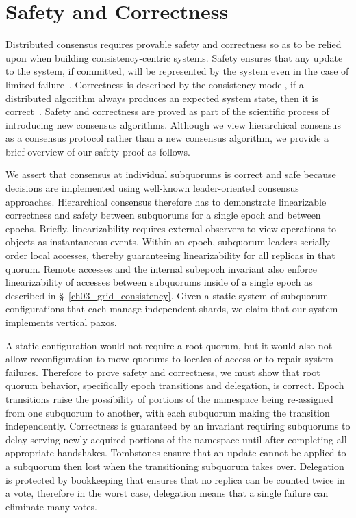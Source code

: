 \section{Safety and Correctness}
\label{ch03_safety}

Distributed consensus requires provable safety and correctness so as to be relied upon when building consistency-centric systems.
Safety ensures that any update to the system, if committed, will be represented by the system even in the case of limited failure~\cite{safety}.
Correctness is described by the consistency model, if a distributed algorithm always produces an expected system state, then it is correct~\cite{correctness}.
Safety and correctness are proved as part of the scientific process of introducing new consensus algorithms.
Although we view hierarchical consensus as a consensus protocol rather than a new consensus algorithm, we provide a brief overview of our safety proof as follows.

We assert that consensus at individual subquorums is correct and safe because decisions are implemented using well-known leader-oriented consensus approaches.
Hierarchical consensus therefore has to demonstrate linearizable correctness and safety between subquorums for a single epoch and between epochs.
Briefly, linearizability requires external observers to view operations to objects as instantaneous events.
Within an epoch, subquorum leaders serially order local accesses, thereby guaranteeing linearizability for all replicas in that quorum.
Remote accesses and the internal subepoch invariant also enforce linearizability of accesses between subquorums inside of a single epoch as described in \S~\ref{ch03_grid_consistency}.
Given a static system of subquorum configurations that each manage independent shards, we claim that our system implements vertical paxos.

A static configuration would not require a root quorum, but it would also not allow reconfiguration to move quorums to locales of access or to repair system failures.
Therefore to prove safety and correctness, we must show that root quorum behavior, specifically epoch transitions and delegation, is correct.
Epoch transitions raise the possibility of portions of the namespace being re-assigned from one subquorum to another, with each subquorum making the transition independently.
Correctness is guaranteed by an invariant requiring subquorums to delay serving newly acquired portions of the namespace until after completing all appropriate handshakes.
Tombstones ensure that an update cannot be applied to a subquorum then lost when the transitioning subquorum takes over.
Delegation is protected by bookkeeping that ensures that no replica can be counted twice in a vote, therefore in the worst case, delegation means that a single failure can eliminate many votes.

